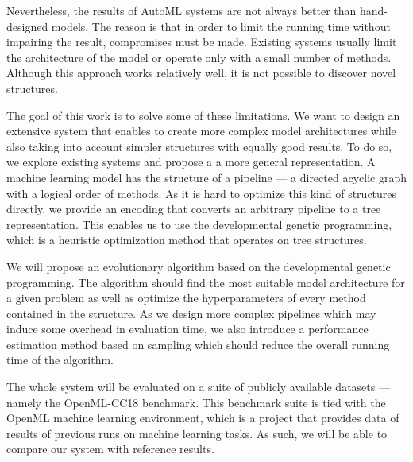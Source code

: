 Nevertheless, the results of AutoML systems are not always better
than hand-designed models. The reason is that in order to limit the running time
without impairing the result, compromises must be made. Existing systems
usually limit the architecture of the model or operate only with a small number
of methods. Although this approach works relatively well, it is not possible to
discover novel structures.

The goal of this work is to solve some of these limitations. We want to design
an extensive system that enables to create more complex model architectures
while also taking into account simpler structures with equally good results.
To do so, we explore existing systems and propose a a more general
representation. A machine learning model has the structure of a pipeline ---
a directed acyclic graph with a logical order of methods. As it is hard to
optimize this kind of structures directly, we provide an encoding that converts
an arbitrary pipeline to a tree representation. This enables us to use the
developmental genetic programming, which is a heuristic optimization method
that operates on tree structures.

We will propose an evolutionary algorithm based on the developmental genetic
programming. The algorithm should find the most suitable model architecture
for a given problem as well as optimize the hyperparameters of every method
contained in the structure. As we design more complex pipelines which may
induce some overhead in evaluation time, we also introduce a performance
estimation method based on sampling which should reduce the overall running
time of the algorithm.

The whole system will be evaluated on a suite of publicly available datasets
--- namely the OpenML-CC18 benchmark. This benchmark suite is tied with the OpenML
machine learning environment, which is a project that provides data of
results of previous runs on machine learning tasks. As such, we will be able
to compare our system with reference results.

